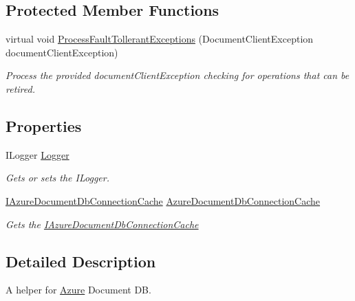 \subsection*{Protected Member Functions}
\begin{DoxyCompactItemize}
\item 
virtual void \hyperlink{classCqrs_1_1Azure_1_1DocumentDb_1_1AzureDocumentDbHelper_a90b2dc3510f45a7cd5e6ed467a6f6d5e_a90b2dc3510f45a7cd5e6ed467a6f6d5e}{Process\+Fault\+Tollerant\+Exceptions} (Document\+Client\+Exception document\+Client\+Exception)
\begin{DoxyCompactList}\small\item\em Process the provided {\itshape document\+Client\+Exception}  checking for operations that can be retired. \end{DoxyCompactList}\end{DoxyCompactItemize}
\subsection*{Properties}
\begin{DoxyCompactItemize}
\item 
I\+Logger \hyperlink{classCqrs_1_1Azure_1_1DocumentDb_1_1AzureDocumentDbHelper_a2943b251ec8cb01b5900607e225de45e_a2943b251ec8cb01b5900607e225de45e}{Logger}
\begin{DoxyCompactList}\small\item\em Gets or sets the I\+Logger. \end{DoxyCompactList}\item 
\hyperlink{interfaceCqrs_1_1Azure_1_1DocumentDb_1_1IAzureDocumentDbConnectionCache}{I\+Azure\+Document\+Db\+Connection\+Cache} \hyperlink{classCqrs_1_1Azure_1_1DocumentDb_1_1AzureDocumentDbHelper_a1cda97d11a3b15128de55b31fe32b9d4_a1cda97d11a3b15128de55b31fe32b9d4}{Azure\+Document\+Db\+Connection\+Cache}
\begin{DoxyCompactList}\small\item\em Gets the \hyperlink{interfaceCqrs_1_1Azure_1_1DocumentDb_1_1IAzureDocumentDbConnectionCache}{I\+Azure\+Document\+Db\+Connection\+Cache} \end{DoxyCompactList}\end{DoxyCompactItemize}


\subsection{Detailed Description}
A helper for \hyperlink{namespaceCqrs_1_1Azure}{Azure} Document DB. 



